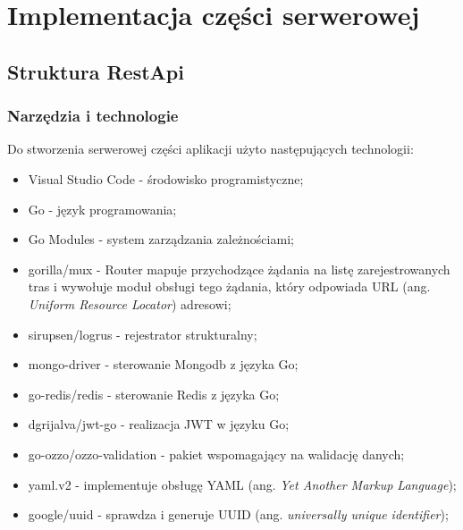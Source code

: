 \section{Implementacja części serwerowej}
\subsection{Struktura RestApi}
\subsubsection{Narzędzia i technologie}
Do stworzenia serwerowej części aplikacji użyto następujących technologii:
\begin{itemize}
\item Visual Studio Code - środowisko programistyczne;
\item Go - język programowania;
\item Go Modules - system zarządzania zależnościami;
\item gorilla/mux - Router mapuje przychodzące żądania na listę zarejestrowanych tras i wywołuje moduł obsługi tego żądania, który odpowiada URL (ang. \textit{Uniform Resource Locator}) adresowi;
\item sirupsen/logrus - rejestrator strukturalny;
\item mongo-driver - sterowanie Mongodb z języka Go;
\item go-redis/redis - sterowanie Redis z języka Go;
\item dgrijalva/jwt-go - realizacja JWT w języku Go;
\item go-ozzo/ozzo-validation - pakiet wspomagający na walidację danych;
\item yaml.v2 - implementuje obsługę YAML (ang. \textit{Yet Another Markup Language});
\item google/uuid - sprawdza i generuje UUID (ang. \textit{universally unique identifier});
\end{itemize}

